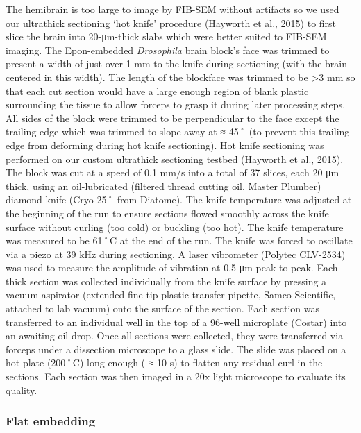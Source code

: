 \documentclass{article}
\begin{document}
The hemibrain is too large to image by FIB-SEM without artifacts so we used our ultrathick sectioning ‘hot knife’ procedure (Hayworth et al., 2015) to first slice the brain into 20-μm-thick slabs which were better suited to FIB-SEM imaging. The Epon-embedded \emph{Drosophila} brain block’s face was trimmed to present a width of just over 1 mm to the knife during sectioning (with the brain centered in this width). The length of the blockface was trimmed to be >3 mm so that each cut section would have a large enough region of blank plastic surrounding the tissue to allow forceps to grasp it during later processing steps. All sides of the block were trimmed to be perpendicular to the face except the trailing edge which was trimmed to slope away at ≈ 45˚ (to prevent this trailing edge from deforming during hot knife sectioning). Hot knife sectioning was performed on our custom ultrathick sectioning testbed (Hayworth et al., 2015). The block was cut at a speed of 0.1 mm/s into a total of 37 slices, each 20 μm thick, using an oil-lubricated (filtered thread cutting oil, Master Plumber) diamond knife (Cryo 25˚ from Diatome). The knife temperature was adjusted at the beginning of the run to ensure sections flowed smoothly across the knife surface without curling (too cold) or buckling (too hot). The knife temperature was measured to be 61˚C at the end of the run. The knife was forced to oscillate via a piezo at 39 kHz during sectioning. A laser vibrometer (Polytec CLV-2534) was used to measure the amplitude of vibration at 0.5 μm peak-to-peak. Each thick section was collected individually from the knife surface by pressing a vacuum aspirator (extended fine tip plastic transfer pipette, Samco Scientific, attached to lab vacuum) onto the surface of the section. Each section was transferred to an individual well in the top of a 96-well microplate (Costar) into an awaiting oil drop. Once all sections were collected, they were transferred via forceps under a dissection microscope to a glass slide. The slide was placed on a hot plate (200˚C) long enough ( ≈ 10 s) to flatten any residual curl in the sections. Each section was then imaged in a 20x light microscope to evaluate its quality.

\subsubsection*{Flat embedding}
\end{document}
